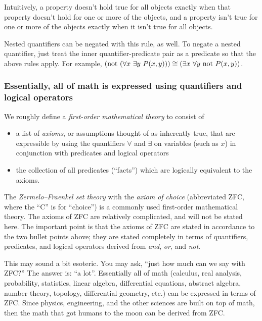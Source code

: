Intuitively, a property doesn't hold true for all objects exactly when that property doesn't hold for one or more of the objects, and a property isn't true for one or more of the objects exactly when it isn't true for all objects.

Nested quantifiers can be negated with this rule, as well. To negate a nested quantifier, just treat the inner quantifier-predicate pair as a predicate so that the above rules apply. For example, $(\text{not }(\forall x \text{ } \exists y \text{ } P(x, y))) \cong (\exists x \text{ } \forall y \text{ } \text{not } P(x, y))$.

\subsubsection{Essentially, all of math is expressed using quantifiers and logical operators}

We roughly define a \textit{first-order mathematical theory} to consist of

\begin{itemize}
    \item a list of \textit{axioms}, or assumptions thought of as inherently true, that are expressible by using the quantifiers $\forall$ and $\exists$ on variables (such as $x$) in conjunction with predicates and logical operators
    \item the collection of all predicates (``facts'') which are logically equivalent to the axioms.
\end{itemize}

The \textit{Zermelo–Fraenkel set theory} with the \textit{axiom of choice} (abbreviated ZFC, where the ``C'' is for ``choice'') is a commonly used first-order mathematical theory. The axioms of ZFC are relatively complicated, and will not be stated here. The important point is that the axioms of ZFC are stated in accordance to the two bullet points above; they are stated completely in terms of quantifiers, predicates, and logical operators derived from \textit{and}, \textit{or}, and \textit{not}.

This may sound a bit esoteric. You may ask, ``just how much can we say with ZFC?'' The answer is: ``a lot''. Essentially all of math (calculus, real analysis, probability, statistics, linear algebra, differential equations, abstract algebra, number theory, topology, differential geometry, etc.) can be expressed in terms of ZFC. Since physics, engineering, and the other sciences are built on top of math, then the math that got humans to the moon can be derived from ZFC.

